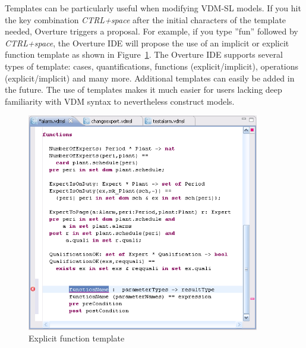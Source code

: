 {Templates can be particularly useful when modifying VDM-SL models. If you hit
the key combination \textit{CTRL+space} after the initial characters
of the template needed, Overture triggers a proposal. For example, if
you type ''fun'' followed by \textit{CTRL+space}, the Overture IDE
will propose the use of an implicit or explicit function template as
shown in Figure~\ref{fig:functionTemplate}. The Overture IDE
supports several types of template: cases, quantifications, functions
(explicit/implicit), operations (explicit/implicit) and many
more. Additional templates can easily be added in the future. The use
of templates makes it much easier for users lacking deep familiarity
with VDM syntax to nevertheless construct models.
\begin{figure}
\begin{center}
\includegraphics[width=4in]{figures/FunctionTemplate}
\caption{Explicit function template}
\label{fig:functionTemplate}
\end{center}
\end{figure}

}
